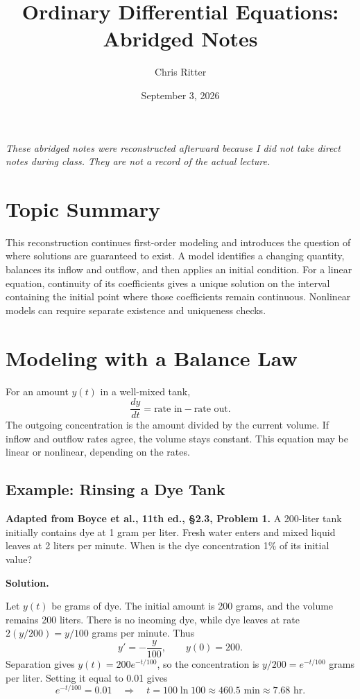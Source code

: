 \documentclass[11pt]{article}
\title{Ordinary Differential Equations: Abridged Notes}
\author{Chris Ritter}
\date{September 3, 2026}
\newenvironment{solution}
    {\par\noindent\textbf{Solution.}\par}
    {\par}
\begin{document}
\maketitle
\begin{center}
\small\emph{These abridged notes were reconstructed afterward because I did not take
direct notes during class. They are not a record of the actual lecture.}
\end{center}
\tableofcontents
\newpage

\section{Topic Summary}
This reconstruction continues first-order modeling and introduces the
question of where solutions are guaranteed to exist. A model identifies
a changing quantity, balances its inflow and outflow, and then applies
an initial condition. For a linear equation, continuity of its
coefficients gives a unique solution on the interval containing the
initial point where those coefficients remain continuous. Nonlinear
models can require separate existence and uniqueness checks.

\section{Modeling with a Balance Law}
For an amount \(y(t)\) in a well-mixed tank,
\[
\boxed{\frac{dy}{dt}=\text{rate in}-\text{rate out}.}
\]
The outgoing concentration is the amount divided by the current
volume. If inflow and outflow rates agree, the volume stays constant.
This equation may be linear or nonlinear, depending on the rates.

\subsection{Example: Rinsing a Dye Tank}
\textbf{Adapted from Boyce et al., 11th ed., \S2.3, Problem 1.}
A 200-liter tank initially contains dye at 1 gram per liter. Fresh
water enters and mixed liquid leaves at 2 liters per minute. When is
the dye concentration 1\% of its initial value?
\begin{solution}
Let \(y(t)\) be grams of dye. The initial amount is 200 grams, and
the volume remains 200 liters. There is no incoming dye, while dye
leaves at rate \(2(y/200)=y/100\) grams per minute. Thus
\[
y'=-\frac{y}{100},\qquad y(0)=200.
\]
Separation gives \(y(t)=200e^{-t/100}\), so the concentration is
\(y/200=e^{-t/100}\) grams per liter. Setting it equal to 0.01 gives
\[
e^{-t/100}=0.01
\quad\Longrightarrow\quad
\boxed{t=100\ln100\approx460.5\text{ min}\approx7.68\text{ hr}.}
\]
\end{solution}
\end{document}
